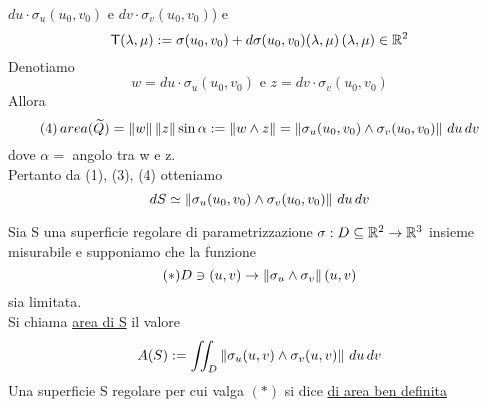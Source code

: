  $du\cdot \sigma_u(u_0,v_0)$ e $dv\cdot \sigma_v(u_0,v_0)$) e
$$\mathsf{T} (\lambda,\mu):= \sigma(u_0,v_0)+d\sigma(u_0,v_0)(\lambda,\mu) \, (\lambda,\mu)\in\mathbb{R}^2$$
Denotiamo 
$$w = du\cdot\sigma_u(u_0,v_0) \text{ e } z = dv\cdot\sigma_v(u_0,v_0)$$
Allora 
$$(4)\, area(\widetilde{Q}) = \left\lVert w\right\rVert\left\lVert z\right\rVert \sin\alpha := \left\lVert w\wedge z\right\rVert
= \left\lVert\sigma_u(u_0,v_0)\wedge \sigma_v(u_0,v_0)\right\rVert\,du\,dv$$
dove $\alpha =$ angolo tra w e z. \\
Pertanto da (1), (3), (4) otteniamo 
$$dS \simeq \left\lVert\sigma_u(u_0,v_0) \wedge \sigma_v(u_0,v_0)\right\rVert\,du\,dv$$
\begin{definition}
  Sia S una superficie regolare di parametrizzazione $\sigma : D\subseteq \mathbb{R}^2 \to \mathbb{R}^3$
  insieme misurabile e supponiamo che la funzione 
  $$(*) D \ni (u,v) \to \left\lVert\sigma_u\wedge\sigma_v\right\rVert(u,v)$$
  sia limitata. \\
  Si chiama \underline{area di S} il valore 
  $$A(S) := \iint_D \left\lVert\sigma_u(u,v)\wedge\sigma_v(u,v)\right\rVert\,du\,dv$$
  Una superficie S regolare per cui valga $(*)$ si dice \underline{di area ben definita}
\end{definition}
